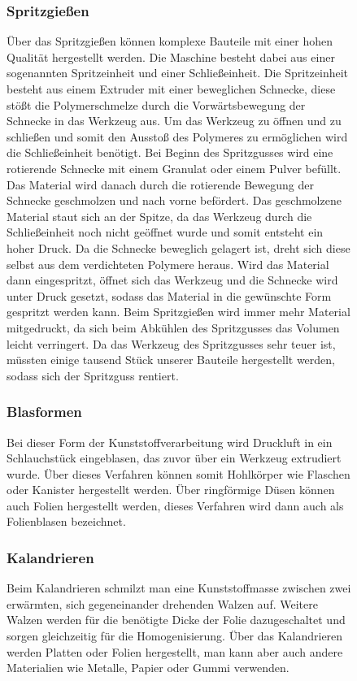 \begin{figure}
\subsubsection{Spritzgießen}
Über das Spritzgießen können komplexe Bauteile mit einer hohen Qualität hergestellt werden. Die Maschine besteht dabei aus
einer sogenannten Spritzeinheit und einer Schließeinheit. Die Spritzeinheit besteht aus einem Extruder mit einer
beweglichen Schnecke, diese stößt die Polymerschmelze durch die Vorwärtsbewegung der Schnecke in das Werkzeug aus.
Um das Werkzeug zu öffnen und zu schließen und somit den Ausstoß des Polymeres zu ermöglichen wird die Schließeinheit
benötigt.
Bei Beginn des Spritzgusses wird eine rotierende Schnecke mit einem Granulat oder einem Pulver befüllt. Das Material
wird danach durch die rotierende Bewegung der Schnecke geschmolzen und nach vorne befördert. Das geschmolzene Material
staut sich an der Spitze, da das Werkzeug durch die Schließeinheit noch nicht geöffnet wurde und somit entsteht ein
hoher Druck. Da die Schnecke beweglich gelagert ist, dreht sich diese selbst aus dem verdichteten Polymere heraus.
Wird das Material dann eingespritzt, öffnet sich das Werkzeug und die Schnecke wird unter Druck gesetzt, sodass das
Material in die gewünschte Form gespritzt  werden kann.
Beim Spritzgießen wird immer mehr Material mitgedruckt, da sich beim Abkühlen des Spritzgusses das Volumen leicht
verringert.
Da das Werkzeug des Spritzgusses sehr teuer ist, müssten einige tausend Stück unserer Bauteile hergestellt werden,
sodass sich der Spritzguss rentiert.

\subsubsection{Blasformen}
Bei dieser Form der Kunststoffverarbeitung wird Druckluft in ein Schlauchstück eingeblasen, das zuvor über ein Werkzeug
extrudiert wurde. Über dieses Verfahren können somit Hohlkörper wie Flaschen oder Kanister hergestellt werden.
Über ringförmige Düsen können auch Folien hergestellt werden, dieses Verfahren wird dann auch als Folienblasen bezeichnet.

\subsubsection{Kalandrieren}
Beim Kalandrieren schmilzt man eine Kunststoffmasse zwischen zwei erwärmten, sich gegeneinander drehenden Walzen auf.
Weitere Walzen werden für die benötigte Dicke der Folie dazugeschaltet und sorgen gleichzeitig für die Homogenisierung.
Über das Kalandrieren werden Platten oder Folien hergestellt, man kann aber auch andere Materialien wie Metalle, Papier
oder Gummi verwenden.


\end{figure}
